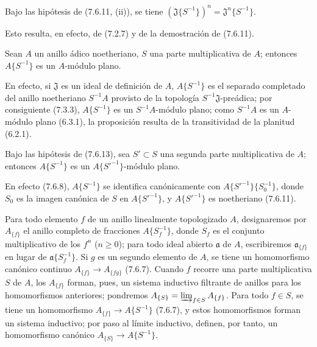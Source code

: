 \begin{corollary}[7.6.12]
\label{0.7.6.12-fr}
Bajo las hipótesis de \textup{(7.6.11, (ii))}, se tiene
$(\mathfrak J\{S^{-1}\})^n=\mathfrak J^n\{S^{-1}\}$.
\end{corollary}

Esto resulta, en efecto, de (7.2.7) y de la demostración de (7.6.11).

\begin{proposition}[7.6.13]
\label{0.7.6.13-fr}
Sean $A$ un anillo ádico noetheriano, $S$ una parte multiplicativa de $A$;
entonces $A\{S^{-1}\}$ es un $A$-módulo plano.
\end{proposition}

En efecto, si $\mathfrak J$ es un ideal de definición de $A$,
$A\{S^{-1}\}$ es el separado completado del anillo noetheriano $S^{-1}A$ provisto
de la topología $S^{-1}\mathfrak J$-preádica; por consiguiente (7.3.3),
$A\{S^{-1}\}$ es un $S^{-1}A$-módulo plano; como $S^{-1}A$ es un
$A$-módulo plano (6.3.1), la proposición resulta de la transitividad de la
planitud (6.2.1).

\begin{corollary}[7.6.14]
\label{0.7.6.14-fr}
Bajo las hipótesis de \textup{(7.6.13)}, sea $S'\subset S$ una segunda parte
multiplicativa de $A$; entonces $A\{S^{-1}\}$ es un
$A\{{S'}^{-1}\}$-módulo plano.
\end{corollary}

En efecto (7.6.8), $A\{S^{-1}\}$ se identifica canónicamente con
$A\{{S'}^{-1}\}\{S_0^{-1}\}$, donde $S_0$ es la imagen canónica de $S$ en
$A\{{S'}^{-1}\}$, y $A\{{S'}^{-1}\}$ es noetheriano (7.6.11).

\begin{env}[7.6.15]
\label{0.7.6.15-fr}
Para todo elemento $f$ de un anillo linealmente topologizado $A$,
designaremos por $A_{\{f\}}$ el anillo completo de fracciones $A\{S_f^{-1}\}$,
donde $S_f$ es el conjunto multiplicativo de los $f^n$ ($n\geq 0$); para todo
ideal abierto $\mathfrak a$ de $A$, escribiremos $\mathfrak a_{\{f\}}$ en
lugar de $\mathfrak a\{S_f^{-1}\}$. Si $g$ es un segundo elemento de $A$, se tiene
un homomorfismo canónico continuo $A_{\{f\}}\to A_{\{fg\}}$ (7.6.7).
Cuando $f$ recorre una parte multiplicativa $S$ de $A$, los $A_{\{f\}}$
forman, pues, un sistema inductivo filtrante de anillos para los homomorfismos
anteriores; pondremos
$A_{\{S\}}=\varinjlim_{f\in S}A_{\{f\}}$. Para todo $f\in S$, se tiene un
homomorfismo $A_{\{f\}}\to A\{S^{-1}\}$ (7.6.7), y
estos homomorfismos forman un sistema inductivo; por paso al límite
inductivo, definen, por tanto, un homomorfismo canónico
$A_{\{S\}}\to A\{S^{-1}\}$.
\end{env}


